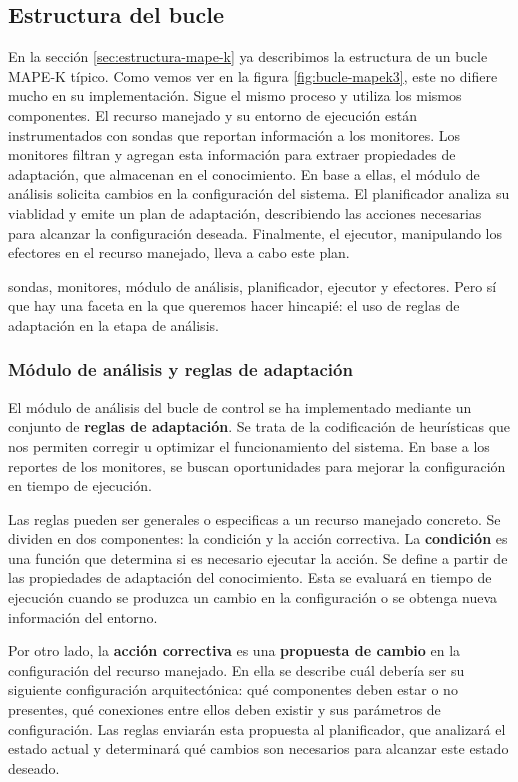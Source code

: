 \subsection{Estructura del bucle}

En la sección \ref{sec:estructura-mape-k} ya describimos la estructura de un bucle MAPE-K típico. Como vemos ver en la figura \ref{fig:bucle-mapek3}, este no difiere mucho en su implementación. Sigue el mismo proceso y utiliza los mismos componentes. El recurso manejado y su entorno de ejecución están instrumentados con sondas que reportan información a los monitores. Los monitores filtran y agregan esta información para extraer propiedades de adaptación, que almacenan en el conocimiento. En base a ellas, el módulo de análisis solicita cambios en la configuración del sistema. El planificador analiza su viablidad y emite un plan de adaptación, describiendo las acciones necesarias para alcanzar la configuración deseada. Finalmente, el ejecutor, manipulando los efectores en el recurso manejado, lleva a cabo este plan.

sondas, monitores, módulo de análisis, planificador, ejecutor y efectores. Pero sí que hay una faceta en la que queremos hacer hincapié: el uso de reglas de adaptación en la etapa de análisis.

\subsubsection{Módulo de análisis y reglas de adaptación}

El módulo de análisis del bucle de control se ha implementado mediante un conjunto de \textbf{reglas de adaptación}. Se trata de la codificación de heurísticas que nos permiten corregir u optimizar el funcionamiento del sistema. En base a los reportes de los monitores, se buscan oportunidades para mejorar la configuración en tiempo de ejecución.

Las reglas pueden ser generales o especificas a un recurso manejado concreto. Se dividen en dos componentes: la condición y la acción correctiva. La \textbf{condición} es una función que determina si es necesario ejecutar la acción. Se define a partir de las propiedades de adaptación del conocimiento. Esta se evaluará en tiempo de ejecución cuando se produzca un cambio en la configuración o se obtenga nueva información del entorno.

Por otro lado, la \textbf{acción correctiva} es una \textbf{propuesta de cambio} en la configuración del recurso manejado. En ella se describe cuál debería ser su siguiente configuración arquitectónica: qué componentes deben estar o no presentes, qué conexiones entre ellos deben existir y sus parámetros de configuración. Las reglas enviarán esta propuesta al planificador, que analizará el estado actual y determinará qué cambios son necesarios para alcanzar este estado deseado.


